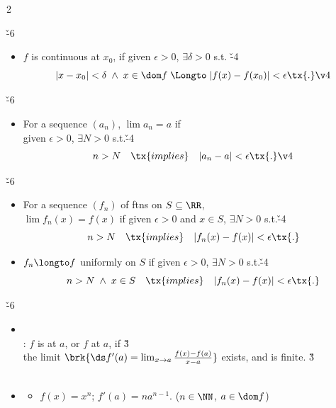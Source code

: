 \documentclass[dvipdfmx,a4paper,titlepage,9pt]{jsarticle}
\begin{document}
\begin{multicols*}{2}
\newpage


\v{-6}
\begin{itemize}[label={:}]
\item $f$ is continuous at $x_0$, if given $\epsilon>0$, $\exists \delta>0$ s.t. \v{-4}
$$|x-x_0|<\delta\;\wedge\;x\in\dom f\;\Longto\;|f(x)-f(x_0)|<\epsilon\tx{.}\v4$$
\end{itemize}

\v{-6}
\begin{itemize}[label={:}]
\item For a sequence $(a_n)$, $\lim a_n=a$ if\\
given $\epsilon>0$, $\exists N>0$ s.t.\v{-4}
$$n>N\quad\tx{implies}\quad |a_n-a|<\epsilon\tx{.}\v4$$
\end{itemize}

\v{-6}
\begin{itemize}[label={-}]
\item For a sequence $(f_n)$ of ftns on $S\subseteq\RR$, \\
$\lim f_n(x)=f(x)$ if given $\epsilon>0$ and $x\in S$, $\exists N>0$ s.t.\v{-4}
$$n>N\quad\tx{implies}\quad |f_n(x)-f(x)|<\epsilon\tx{.}$$

\item $f_n\longto f$ uniformly on $S$ if given $\epsilon>0$, $\exists N>0$ s.t.\v{-4}
$$n>N\;\wedge\;x\in S\quad\tx{implies}\quad |f_n(x)-f(x)|<\epsilon\tx{.}$$
\end{itemize}

\newpage


\v{-6}
\begin{itemize}[label={-}]
\item{} \\
: $f$ is  at $a$, or $f$  at $a$, if \v3\\
\;\; the limit $\brk{\ds f'(a)=\lim_{x\to a}\frac{f(x)-f(a)}{x-a}}$ exists, and is finite. \v3\\
\;\\

\item{}
\begin{itemize}[label=\Cdot]
\setlength{\leftskip}{-5pt}
\item $f(x)=x^n$; $f'(a)=na^{n-1}$. \;($n\in\NN$, $a\in\dom f$)\\
\end{itemize}


\end{itemize}
\end{multicols*}
\end{document}
